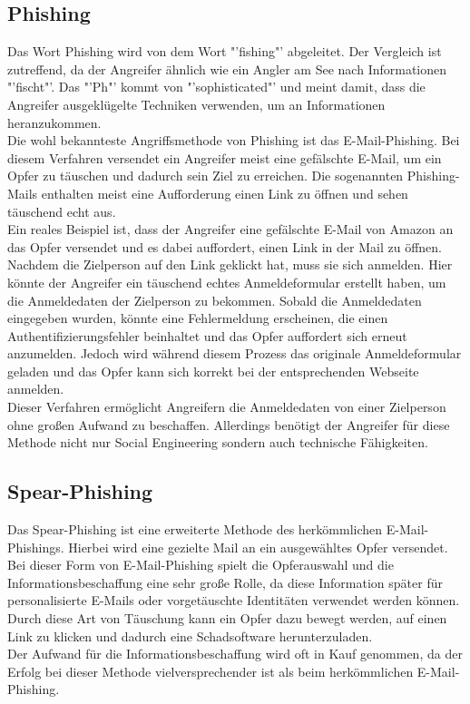 		\subsection{Phishing}
		Das Wort Phishing wird von dem Wort "'fishing"' abgeleitet. Der Vergleich ist zutreffend, da der Angreifer ähnlich wie ein Angler am See nach Informationen "'fischt"'. Das "'Ph"' kommt von "'sophisticated"' und meint damit, dass die Angreifer ausgeklügelte Techniken verwenden, um an Informationen heranzukommen.\cite{PhishingExposed}\\
		Die wohl bekannteste Angriffsmethode von Phishing ist das E-Mail-Phishing. Bei diesem Verfahren versendet ein Angreifer meist eine gefälschte E-Mail, um ein Opfer zu täuschen und dadurch sein Ziel zu erreichen. Die sogenannten Phishing-Mails enthalten meist eine Aufforderung einen Link zu öffnen und sehen täuschend echt aus.\\
		Ein reales Beispiel ist, dass der Angreifer eine gefälschte E-Mail von Amazon an das Opfer versendet und es dabei auffordert, einen Link in der Mail zu öffnen. Nachdem die Zielperson auf den Link geklickt hat, muss sie sich anmelden. Hier könnte der Angreifer ein täuschend echtes Anmeldeformular erstellt haben, um die Anmeldedaten der Zielperson zu bekommen. Sobald die Anmeldedaten eingegeben wurden, könnte eine Fehlermeldung erscheinen, die einen Authentifizierungsfehler beinhaltet und das Opfer auffordert sich erneut anzumelden. Jedoch wird während diesem Prozess das originale Anmeldeformular geladen und das Opfer kann sich korrekt bei der entsprechenden Webseite anmelden. \\
		Dieser Verfahren ermöglicht Angreifern die Anmeldedaten von einer Zielperson ohne großen Aufwand zu beschaffen. Allerdings benötigt der Angreifer für diese Methode nicht nur Social Engineering sondern auch technische Fähigkeiten.\cite{PhishingDarkWaters}
		
		\subsection{Spear-Phishing}
		Das Spear-Phishing ist eine erweiterte Methode des herkömmlichen E-Mail-Phishings. Hierbei wird eine gezielte Mail an ein ausgewähltes Opfer versendet.\cite{SpearPhishingPaper}\\
		Bei dieser Form von E-Mail-Phishing spielt die Opferauswahl und die Informationsbeschaffung eine sehr große Rolle, da diese Information später für personalisierte E-Mails oder vorgetäuschte Identitäten verwendet werden können. Durch diese Art von Täuschung kann ein Opfer dazu bewegt werden, auf einen Link zu klicken und dadurch eine Schadsoftware herunterzuladen.\cite{SpearPhishingPaper} \\
		Der Aufwand für die Informationsbeschaffung wird oft in Kauf genommen, da der Erfolg bei dieser Methode vielversprechender ist als beim herkömmlichen E-Mail-Phishing.

